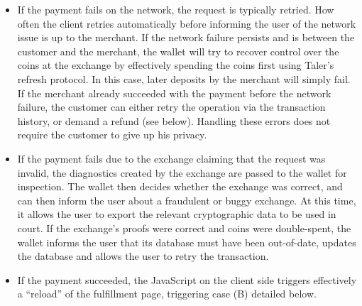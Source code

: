 \documentclass{IEEEtran}
\begin{document}
\begin{itemize}
\item If the payment fails on the network, the request is typically
 retried.  How often the client retries automatically before informing
 the user of the network issue is up to the merchant.  If the network
 failure persists and is between the customer and the merchant, the wallet
 will try to recover control over the coins at the exchange by
 effectively spending the coins first using Taler's
 refresh protocol.  In this case, later deposits by the merchant
 will simply fail.  If the merchant already succeeded with the payment
 before the network failure, the customer can either retry the
 operation via the transaction history, or demand a refund (see
 below).  Handling these errors does not require the customer to give
 up his privacy.
\item If the payment fails due to the exchange
 claiming that the request was invalid, the diagnostics created by the
 exchange are passed to the wallet for inspection.  The wallet then
 decides whether the exchange was correct, and can then inform the
 user about a fraudulent or buggy exchange.  At this time, it allows
 the user to export the relevant cryptographic data to be used in
 court.  If the exchange's proofs were correct and coins were
 double-spent, the wallet informs the user that its database must have
 been out-of-date, updates the database and allows the user to retry
 the transaction.
\item If the payment succeeded, the JavaScript on the
 client side triggers effectively a ``reload'' of the fulfillment
 page, triggering case (B) detailed below.
\end{itemize}
\end{document}
